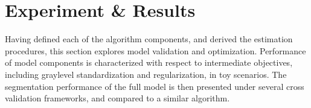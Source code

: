 \chapter{Experiment \& Results}\label{ch-exp}
Having defined each of the algorithm components, and derived the estimation procedures,
this section explores model validation and optimization.
Performance of model components is characterized with respect to intermediate objectives,
including graylevel standardization and regularization, in toy scenarios.
The segmentation performance of the full model is then presented
under several cross validation frameworks, and compared to a similar algorithm.
